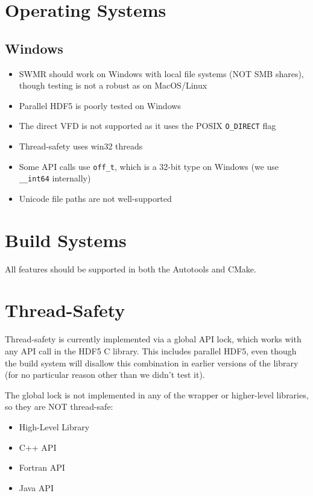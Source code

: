 
\section{Operating Systems}

\subsection{Windows}
\begin{itemize}
    \item SWMR should work on Windows with local file systems (NOT SMB shares), though testing is not a robust as on MacOS/Linux
    \item Parallel HDF5 is poorly tested on Windows
    \item The direct VFD is not supported as it uses the POSIX \texttt{O\_DIRECT} flag
    \item Thread-safety uses win32 threads
    \item Some API calls use \texttt{off\_t}, which is a 32-bit type on Windows (we use \texttt{\_\_int64} internally)
    \item Unicode file paths are not well-supported
\end{itemize}

\section{Build Systems}

All features should be supported in both the Autotools and CMake.

\section{Thread-Safety}

Thread-safety is currently implemented via a global API lock, which works with any API call in the HDF5 C library. This includes parallel HDF5, even though the build system will disallow this combination in earlier versions of the library (for no particular reason other than we didn't test it).

The global lock is not implemented in any of the wrapper or higher-level libraries, so they are NOT thread-safe:

\begin{itemize}
    \item High-Level Library
    \item C++ API
    \item Fortran API
    \item Java API
\end{itemize}

